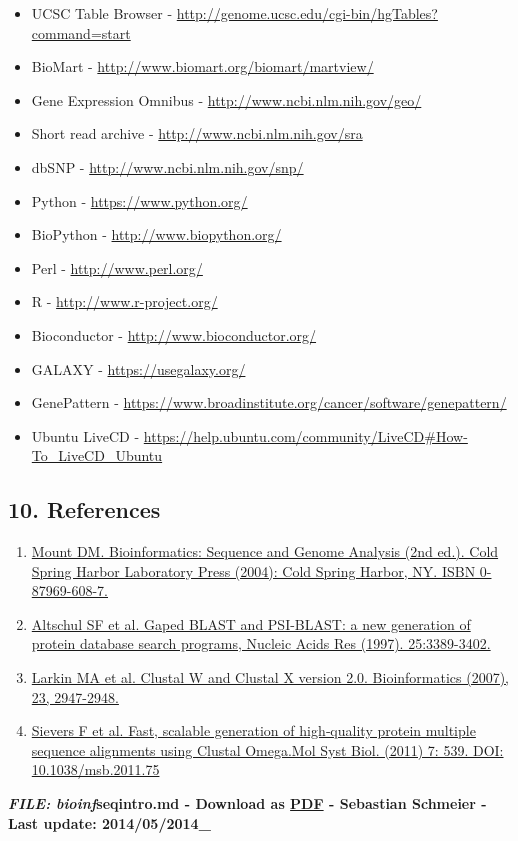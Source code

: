 \documentclass[]{article}
\begin{document}
\begin{itemize}
\item
  UCSC Table Browser -
  \url{http://genome.ucsc.edu/cgi-bin/hgTables?command=start}
\item
  BioMart - \url{http://www.biomart.org/biomart/martview/}
\item
  Gene Expression Omnibus - \url{http://www.ncbi.nlm.nih.gov/geo/}
\item
  Short read archive - \url{http://www.ncbi.nlm.nih.gov/sra}
\item
  dbSNP - \url{http://www.ncbi.nlm.nih.gov/snp/}
\item
  Python - \url{https://www.python.org/}
\item
  BioPython - \url{http://www.biopython.org/}
\item
  Perl - \url{http://www.perl.org/}
\item
  R - \url{http://www.r-project.org/}
\item
  Bioconductor - \url{http://www.bioconductor.org/}
\item
  GALAXY - \url{https://usegalaxy.org/}
\item
  GenePattern -
  \url{https://www.broadinstitute.org/cancer/software/genepattern/}
\item
  Ubuntu LiveCD -
  \url{https://help.ubuntu.com/community/LiveCD\#How-To_LiveCD_Ubuntu}
\end{itemize}

\subsection{10. References}\label{references}

\begin{enumerate}
\def\labelenumi{\arabic{enumi}.}
\itemsep1pt\parskip0pt
\item
  \href{http://www.cshlpress.com/default.tpl?cart=14004538673655488\&fromlink=T\&linkaction=full\&linksortby=oop_title\&--eqSKUdatarq=466}{Mount
  DM. Bioinformatics: Sequence and Genome Analysis (2nd ed.). Cold
  Spring Harbor Laboratory Press (2004): Cold Spring Harbor, NY. ISBN
  0-87969-608-7.}
\item
  \href{http://www.ncbi.nlm.nih.gov/pubmed/?term=9254694}{Altschul SF et
  al. Gaped BLAST and PSI-BLAST: a new generation of protein database
  search programs, Nucleic Acids Res (1997). 25:3389-3402.}
\item
  \href{http://www.ncbi.nlm.nih.gov/pubmed/17846036}{Larkin MA et al.
  Clustal W and Clustal X version 2.0. Bioinformatics (2007), 23,
  2947-2948.}
\item
  \href{http://msb.embopress.org/content/7/1/539}{Sievers F et al. Fast,
  scalable generation of high‐quality protein multiple sequence
  alignments using Clustal Omega.Mol Syst Biol. (2011) 7: 539. DOI:
  10.1038/msb.2011.75}
\end{enumerate}

\textbf{\emph{FILE: bioinf}seqintro.md - Download as
\href{http://compbio.massey.ac.nz/wiki/data/c1/doc/bioinf_seqintro.pdf}{PDF}
- Sebastian Schmeier - Last update: 2014/05/2014\_}
\end{document}
